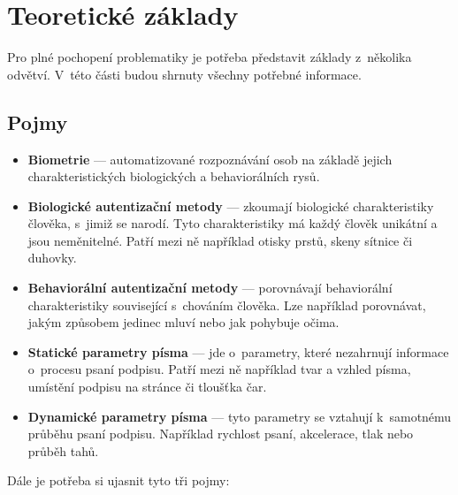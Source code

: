 
\chapter{Teoretické základy}
Pro plné pochopení problematiky je potřeba představit základy z~několika odvětví. 
V~této části budou shrnuty všechny potřebné informace. 

\section{Pojmy}\label{sec:pojmy}
\begin{itemize} 
  \item \textbf{Biometrie} --- automatizované rozpoznávání osob na základě jejich charakteristických biologických a behaviorálních rysů.~\cite{DrahanskýMartin2011} %
  \item \textbf{Biologické autentizační metody} --- zkoumají biologické charakteristiky člověka, s~jimiž se narodí. Tyto charakteristiky má každý člověk unikátní a jsou neměnitelné. Patří mezi ně například otisky prstů, skeny sítnice či duhovky.  
  \item \textbf{Behaviorální autentizační metody} --- porovnávají behaviorální charakteristiky související s~chováním člověka. Lze například porovnávat, jakým způsobem jedinec mluví nebo jak pohybuje očima.
  \item \textbf{Statické parametry písma} --- jde o~parametry, které nezahrnují informace o~procesu psaní podpisu. Patří mezi ně například tvar a vzhled písma, umístění podpisu na stránce či tloušťka čar.
  \item \textbf{Dynamické parametry písma} --- tyto parametry se vztahují k~samotnému průběhu psaní podpisu. Například rychlost psaní, akcelerace, tlak nebo průběh tahů.
\end{itemize}
Dále je potřeba si ujasnit tyto tři pojmy:
